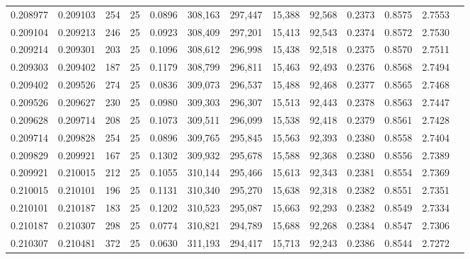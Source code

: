 \begin{tabular}{rrrrrrrrrrrrr}
0.208977 & 0.209103 &   254 &  25 &                                     0.0896 & 308,163 & 297,447 &  15,388 &  92,568 & 0.2373 & 0.8575 & 2.7553 \\
0.209104 & 0.209213 &   246 &  25 &                                     0.0923 & 308,409 & 297,201 &  15,413 &  92,543 & 0.2374 & 0.8572 & 2.7530 \\
0.209214 & 0.209301 &   203 &  25 &                                     0.1096 & 308,612 & 296,998 &  15,438 &  92,518 & 0.2375 & 0.8570 & 2.7511 \\
0.209303 & 0.209402 &   187 &  25 &                                     0.1179 & 308,799 & 296,811 &  15,463 &  92,493 & 0.2376 & 0.8568 & 2.7494 \\
0.209402 & 0.209526 &   274 &  25 &                                     0.0836 & 309,073 & 296,537 &  15,488 &  92,468 & 0.2377 & 0.8565 & 2.7468 \\
0.209526 & 0.209627 &   230 &  25 &                                     0.0980 & 309,303 & 296,307 &  15,513 &  92,443 & 0.2378 & 0.8563 & 2.7447 \\
0.209628 & 0.209714 &   208 &  25 &                                     0.1073 & 309,511 & 296,099 &  15,538 &  92,418 & 0.2379 & 0.8561 & 2.7428 \\
0.209714 & 0.209828 &   254 &  25 &                                     0.0896 & 309,765 & 295,845 &  15,563 &  92,393 & 0.2380 & 0.8558 & 2.7404 \\
0.209829 & 0.209921 &   167 &  25 &                                     0.1302 & 309,932 & 295,678 &  15,588 &  92,368 & 0.2380 & 0.8556 & 2.7389 \\
0.209921 & 0.210015 &   212 &  25 &                                     0.1055 & 310,144 & 295,466 &  15,613 &  92,343 & 0.2381 & 0.8554 & 2.7369 \\
0.210015 & 0.210101 &   196 &  25 &                                     0.1131 & 310,340 & 295,270 &  15,638 &  92,318 & 0.2382 & 0.8551 & 2.7351 \\
0.210101 & 0.210187 &   183 &  25 &                                     0.1202 & 310,523 & 295,087 &  15,663 &  92,293 & 0.2382 & 0.8549 & 2.7334 \\
0.210187 & 0.210307 &   298 &  25 &                                     0.0774 & 310,821 & 294,789 &  15,688 &  92,268 & 0.2384 & 0.8547 & 2.7306 \\
0.210307 & 0.210481 &   372 &  25 &                                     0.0630 & 311,193 & 294,417 &  15,713 &  92,243 & 0.2386 & 0.8544 & 2.7272 \\

\end{tabular}
